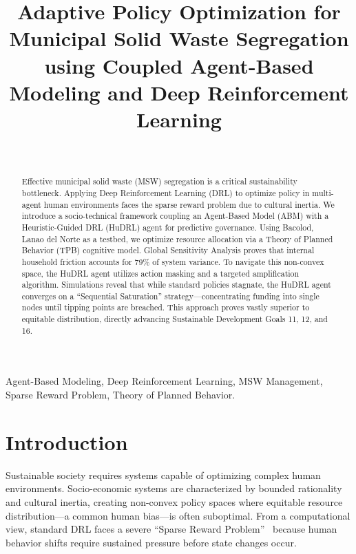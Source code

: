 \documentclass[journal,a4paper]{IEEEtran}
\begin{document}
\title{Adaptive Policy Optimization for Municipal Solid Waste Segregation using Coupled Agent-Based Modeling and Deep Reinforcement Learning}

\author{
 \\
}

\maketitle

\begin{abstract}
Effective municipal solid waste (MSW) segregation is a critical sustainability bottleneck. Applying Deep Reinforcement Learning (DRL) to optimize policy in multi-agent human environments faces the sparse reward problem due to cultural inertia. We introduce a socio-technical framework coupling an Agent-Based Model (ABM) with a Heuristic-Guided DRL (HuDRL) agent for predictive governance. Using Bacolod, Lanao del Norte as a testbed, we optimize resource allocation via a Theory of Planned Behavior (TPB) cognitive model. Global Sensitivity Analysis proves that internal household friction accounts for 79\% of system variance. To navigate this non-convex space, the HuDRL agent utilizes action masking and a targeted amplification algorithm. Simulations reveal that while standard policies stagnate, the HuDRL agent converges on a ``Sequential Saturation'' strategy—concentrating funding into single nodes until tipping points are breached. This approach proves vastly superior to equitable distribution, directly advancing Sustainable Development Goals 11, 12, and 16.
\end{abstract}

\begin{IEEEkeywords}
Agent-Based Modeling, Deep Reinforcement Learning, MSW Management, Sparse Reward Problem, Theory of Planned Behavior.
\end{IEEEkeywords}

\section{Introduction}
Sustainable society requires systems capable of optimizing complex human environments. Socio-economic systems are characterized by bounded rationality and cultural inertia, creating non-convex policy spaces where equitable resource distribution—a common human bias—is often suboptimal. From a computational view, standard DRL faces a severe ``Sparse Reward Problem''~\cite{zheng2022b} because human behavior shifts require sustained pressure before state changes occur.
\end{document}
